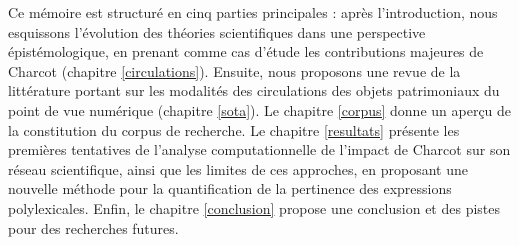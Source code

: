 Ce mémoire est structuré en cinq parties principales : après l'introduction, nous esquissons l'évolution des théories scientifiques dans une perspective épistémologique, en prenant comme cas d'étude les contributions majeures de Charcot (chapitre \ref{circulations}).
Ensuite, nous proposons une revue de la littérature portant sur les modalités des circulations des objets patrimoniaux du point de vue numérique (chapitre \ref{sota}). Le chapitre \ref{corpus} donne un aperçu de la constitution du corpus de recherche. Le chapitre \ref{resultats} présente les premières tentatives de l'analyse computationnelle de l'impact de Charcot sur son réseau scientifique, ainsi que les limites de ces approches, en proposant une nouvelle méthode pour la quantification de la pertinence des expressions polylexicales. Enfin, le chapitre \ref{conclusion} propose une conclusion et des pistes pour des recherches futures.










